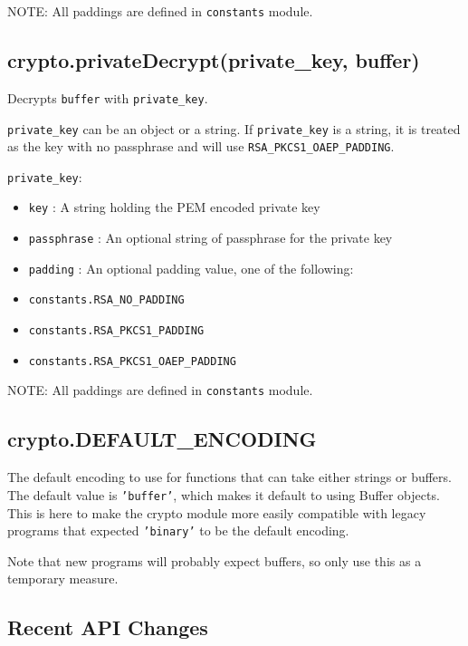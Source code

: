 NOTE: All paddings are defined in \texttt{constants} module.

\subsection{crypto.privateDecrypt(private\_key,
buffer)}\label{crypto.privatedecryptprivateux5fkey-buffer}

Decrypts \texttt{buffer} with \texttt{private\_key}.

\texttt{private\_key} can be an object or a string. If
\texttt{private\_key} is a string, it is treated as the key with no
passphrase and will use \texttt{RSA\_PKCS1\_OAEP\_PADDING}.

\texttt{private\_key}:

\begin{itemize}
\itemsep1pt\parskip0pt
\item
  \texttt{key} : A string holding the PEM encoded private key
\item
  \texttt{passphrase} : An optional string of passphrase for the private
  key
\item
  \texttt{padding} : An optional padding value, one of the following:
\item
  \texttt{constants.RSA\_NO\_PADDING}
\item
  \texttt{constants.RSA\_PKCS1\_PADDING}
\item
  \texttt{constants.RSA\_PKCS1\_OAEP\_PADDING}
\end{itemize}

NOTE: All paddings are defined in \texttt{constants} module.

\subsection{crypto.DEFAULT\_ENCODING}\label{crypto.defaultux5fencoding}

The default encoding to use for functions that can take either strings
or buffers. The default value is \texttt{'buffer'}, which makes it
default to using Buffer objects. This is here to make the crypto module
more easily compatible with legacy programs that expected
\texttt{'binary'} to be the default encoding.

Note that new programs will probably expect buffers, so only use this as
a temporary measure.

\subsection{Recent API Changes}\label{recent-api-changes}

